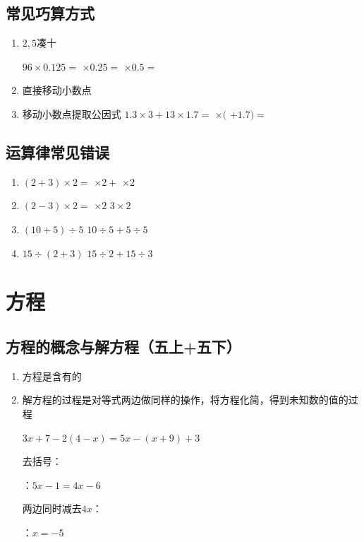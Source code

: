 \subsection*{常见巧算方式}
\begin{enumerate}
    \item $2, 5$凑十
    
    $96 \times 0.125 = $  $\times 0.25 = $  $\times 0.5 = $ 
    \item 直接移动小数点

    \item 移动小数点提取公因式
    $1.3 \times 3 + 13 \times 1.7 = $  $\times ($ $+1.7) = $ 
\end{enumerate}
\subsection*{运算律常见错误}
\begin{enumerate}
    \item $(2+3) \times 2 = $ $\times 2 + $ $\times 2$
    \item $(2-3) \times 2 = $ $\times 2$ \blkda{$-$} $3 \times 2$
    \item $(10+5) \div 5$ \blkda{$=$}$10 \div 5 + 5 \div 5$
    \item $15 \div (2+3)$ \blkda{$\neq$}$15 \div 2 + 15 \div 3$
\end{enumerate}
    
\section*{方程}
\subsection*{方程的概念与解方程（五上+五下）}
\begin{enumerate}
    \item 方程是含有的
    \item 解方程的过程是对等式两边做同样的操作，将方程化简，得到未知数的值的过程

    ${3x} + 7 - 2\left( {4 - x}\right)  = {5x} - \left( {x + 9}\right)  + 3$

    去括号：

    ：${5x} - 1 = {4x} - 6$

    两边同时减去$4x$： 

    ：$x = -5$
    
\end{enumerate}

